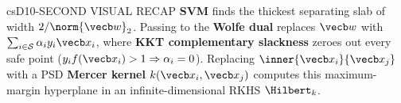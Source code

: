 \documentclass[../../../../master.tex]{subfiles}
\begin{document}
\begin{cscolumns}
\begin{cscard}{csD}{10-SECOND VISUAL RECAP}
  \sffamily\footnotesize
  \textbf{SVM} finds the thickest separating slab of width $2/\norm{\vecb w}_2$.
  Passing to the \textbf{Wolfe dual} replaces $\vecb w$ with $\sum_{i\in\mathcal S}\alpha_iy_i\vecb x_i$, where \textbf{KKT complementary slackness} zeroes out every safe point ($y_if(\vecb x_i)>1\Rightarrow\alpha_i=0$).
  Replacing $\inner{\vecb x_i}{\vecb x_j}$ with a PSD \textbf{Mercer kernel} $k(\vecb x_i,\vecb x_j)$ computes this maximum-margin hyperplane in an infinite-dimensional RKHS $\Hilbert_k$.
\end{cscard}
\end{cscolumns}

\csend
\end{document}
